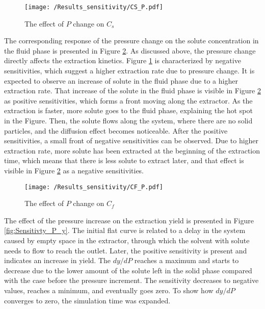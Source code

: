 \documentclass[../Article_Model_Parameters.tex]{subfiles}
\begin{document}
	\begin{figure}[h!]
		\centering
		\texttt{[image: /Results\_sensitivity/CS\_P.pdf]}
		\caption{The effect of $P$ change on $C_s$}
		\label{fig:Sensitivty_P_CS}
	\end{figure}

	The corresponding response of the pressure change on the solute concentration in the fluid phase is presented in Figure \ref{fig:Sensitivty_P_CF}. As discussed above, the pressure change directly affects the extraction kinetics. Figure \ref{fig:Sensitivty_P_CS} is characterized by negative sensitivities, which suggest a higher extraction rate due to pressure change. It is expected to observe an increase of solute in the fluid phase due to a higher extraction rate. That increase of the solute in the fluid phase is visible in Figure \ref{fig:Sensitivty_P_CF} as positive sensitivities, which forms a front moving along the extractor. As the extraction is faster, more solute goes to the fluid phase, explaining the hot spot in the Figure. Then, the solute flows along the system, where there are no solid particles, and the diffusion effect becomes noticeable. After the positive sensitivities, a small front of negative sensitivities can be observed. Due to higher extraction rate, more solute has been extracted at the beginning of the extraction time, which means that there is less solute to extract later, and that effect is visible in Figure \ref{fig:Sensitivty_P_CF} as a negative sensitivities.

	\begin{figure}[h!]
		\centering
		\texttt{[image: /Results\_sensitivity/CF\_P.pdf]}
		\caption{The effect of $P$ change on $C_f$}
		\label{fig:Sensitivty_P_CF}
	\end{figure}

	The effect of the pressure increase on the extraction yield is presented in Figure \ref{fig:Sensitivty_P_y}. The initial flat curve is related to a delay in the system caused by empty space in the extractor, through which the solvent with solute needs to flow to reach the outlet. Later, the positive sensitivity is present and indicates an increase in yield. The $dy / dP$ reaches a maximum and starts to decrease due to the lower amount of the solute left in the solid phase compared with the case before the pressure increment. The sensitivity decreases to negative values, reaches a minimum, and eventually goes zero. To show how $dy / dP$ converges to zero, the simulation time was expanded.
\end{document}
